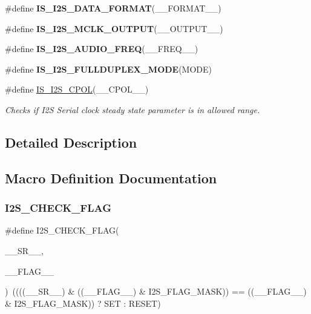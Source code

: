 \begin{DoxyCompactItemize}
\#define {\bfseries I\+S\+\_\+\+I2\+S\+\_\+\+D\+A\+T\+A\+\_\+\+F\+O\+R\+M\+AT}(\+\_\+\+\_\+\+F\+O\+R\+M\+A\+T\+\_\+\+\_\+)
\item 
\#define {\bfseries I\+S\+\_\+\+I2\+S\+\_\+\+M\+C\+L\+K\+\_\+\+O\+U\+T\+P\+UT}(\+\_\+\+\_\+\+O\+U\+T\+P\+U\+T\+\_\+\+\_\+)
\item 
\#define {\bfseries I\+S\+\_\+\+I2\+S\+\_\+\+A\+U\+D\+I\+O\+\_\+\+F\+R\+EQ}(\+\_\+\+\_\+\+F\+R\+E\+Q\+\_\+\+\_\+)
\item 
\#define {\bfseries I\+S\+\_\+\+I2\+S\+\_\+\+F\+U\+L\+L\+D\+U\+P\+L\+E\+X\+\_\+\+M\+O\+DE}(M\+O\+DE)
\item 
\#define \hyperlink{group___i2_s___private___macros_gae30b8feee20548dd36022155251de35d}{I\+S\+\_\+\+I2\+S\+\_\+\+C\+P\+OL}(\+\_\+\+\_\+\+C\+P\+O\+L\+\_\+\+\_\+)
\begin{DoxyCompactList}\small\item\em Checks if I2S Serial clock steady state parameter is in allowed range. \end{DoxyCompactList}\end{DoxyCompactItemize}


\subsection{Detailed Description}


\subsection{Macro Definition Documentation}
\mbox{\label{group___i2_s___private___macros_ga3964ad318e0958654fae2ff925456826}} 
\subsubsection{\texorpdfstring{I2\+S\+\_\+\+C\+H\+E\+C\+K\+\_\+\+F\+L\+AG}{I2S\_CHECK\_FLAG}}
{\footnotesize\ttfamily \#define I2\+S\+\_\+\+C\+H\+E\+C\+K\+\_\+\+F\+L\+AG(\begin{DoxyParamCaption}\item[{}]{\+\_\+\+\_\+\+S\+R\+\_\+\+\_\+,  }\item[{}]{\+\_\+\+\_\+\+F\+L\+A\+G\+\_\+\+\_\+ }\end{DoxyParamCaption})~((((\+\_\+\+\_\+\+S\+R\+\_\+\+\_\+) \& ((\+\_\+\+\_\+\+F\+L\+A\+G\+\_\+\+\_\+) \& I2\+S\+\_\+\+F\+L\+A\+G\+\_\+\+M\+A\+SK)) == ((\+\_\+\+\_\+\+F\+L\+A\+G\+\_\+\+\_\+) \& I2\+S\+\_\+\+F\+L\+A\+G\+\_\+\+M\+A\+SK)) ? S\+ET \+: R\+E\+S\+ET)}



